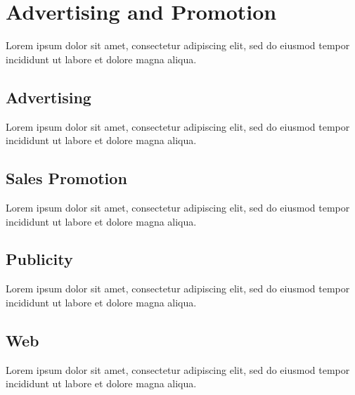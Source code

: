 
\section{Advertising and Promotion}

Lorem ipsum dolor sit amet, consectetur adipiscing elit, sed do eiusmod tempor incididunt ut labore et dolore magna aliqua.

\subsection{Advertising}

Lorem ipsum dolor sit amet, consectetur adipiscing elit, sed do eiusmod tempor incididunt ut labore et dolore magna aliqua.

\subsection{Sales Promotion}

Lorem ipsum dolor sit amet, consectetur adipiscing elit, sed do eiusmod tempor incididunt ut labore et dolore magna aliqua.

\subsection{Publicity}

Lorem ipsum dolor sit amet, consectetur adipiscing elit, sed do eiusmod tempor incididunt ut labore et dolore magna aliqua.

\subsection{Web}

Lorem ipsum dolor sit amet, consectetur adipiscing elit, sed do eiusmod tempor incididunt ut labore et dolore magna aliqua.
